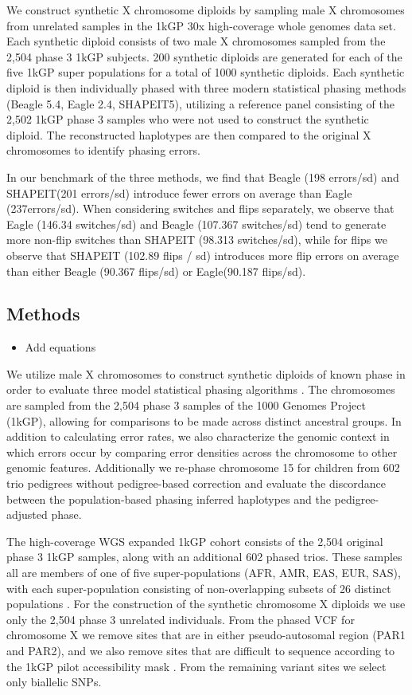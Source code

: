 We construct synthetic X chromosome diploids by sampling male X chromosomes from unrelated samples in the 1kGP 30x high-coverage whole genomes data set. Each synthetic diploid consists of two male X chromosomes sampled from the 2,504 phase 3 1kGP subjects. 200 synthetic diploids are generated for each of the five 1kGP super populations for a total of 1000 synthetic diploids. Each synthetic diploid is then individually phased with three modern statistical phasing methods (Beagle 5.4, Eagle 2.4, SHAPEIT5), utilizing a reference panel consisting of the 2,502 1kGP phase 3 samples who were not used to construct the synthetic diploid. The reconstructed haplotypes are then compared to the original X chromosomes to identify phasing errors.

In our benchmark of the three methods, we find that Beagle (198 errors/sd) and SHAPEIT(201 errors/sd) introduce fewer errors on average than Eagle (237errors/sd).  When considering switches and flips separately, we observe that Eagle (146.34 switches/sd) and Beagle (107.367 switches/sd) tend to generate more non-flip switches than SHAPEIT (98.313 switches/sd), while for flips we observe that SHAPEIT (102.89 flips / sd) introduces more flip errors on average than either Beagle (90.367 flips/sd) or Eagle(90.187 flips/sd).

\subsection{Methods}

\begin{itemize}
    \item Add equations
\end{itemize}

We utilize male X chromosomes to construct synthetic diploids of known phase in order to evaluate three model statistical phasing algorithms \citep{Browning2021, Hofmeister2023, Loh2016}. The chromosomes are sampled from the 2,504 phase 3 samples of the 1000 Genomes Project (1kGP), allowing for comparisons to be made across distinct ancestral groups. In addition to calculating error rates, we also characterize the genomic context in which errors occur by comparing error densities across the chromosome to other genomic features. Additionally we re-phase chromosome 15 for children from 602 trio pedigrees without pedigree-based correction and evaluate the discordance between the population-based phasing inferred haplotypes and the pedigree-adjusted phase.

The high-coverage WGS expanded 1kGP cohort consists of the 2,504 original phase 3 1kGP samples, along with an additional 602 phased trios. These samples all are members of one of five super-populations (AFR, AMR, EAS, EUR, SAS), with each super-population consisting of non-overlapping subsets of 26 distinct populations \citep{ByrskaBishop2022}. For the construction of the synthetic chromosome X diploids we use only the 2,504 phase 3 unrelated individuals. From the phased VCF for chromosome X we remove sites that are in either pseudo-autosomal region (PAR1 and PAR2), and we also remove sites that are difficult to sequence according to the 1kGP pilot accessibility mask \citep{auton2015}. From the remaining variant sites we select only biallelic SNPs.  


